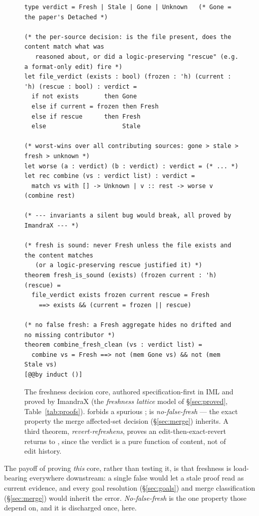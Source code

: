 \begin{figure}[H]
\begin{lstlisting}[language=IML]
type verdict = Fresh | Stale | Gone | Unknown   (* Gone = the paper's Detached *)

(* the per-source decision: is the file present, does the content match what was
   reasoned about, or did a logic-preserving "rescue" (e.g. a format-only edit) fire *)
let file_verdict (exists : bool) (frozen : 'h) (current : 'h) (rescue : bool) : verdict =
  if not exists       then Gone
  else if current = frozen then Fresh
  else if rescue      then Fresh
  else                     Stale

(* worst-wins over all contributing sources: gone > stale > fresh > unknown *)
let worse (a : verdict) (b : verdict) : verdict = (* ... *)
let rec combine (vs : verdict list) : verdict =
  match vs with [] -> Unknown | v :: rest -> worse v (combine rest)

(* --- invariants a silent bug would break, all proved by ImandraX --- *)

(* fresh is sound: never Fresh unless the file exists and the content matches
   (or a logic-preserving rescue justified it) *)
theorem fresh_is_sound (exists) (frozen current : 'h) (rescue) =
  file_verdict exists frozen current rescue = Fresh
    ==> exists && (current = frozen || rescue)

(* no false fresh: a Fresh aggregate hides no drifted and no missing contributor *)
theorem combine_fresh_clean (vs : verdict list) =
  combine vs = Fresh ==> not (mem Gone vs) && not (mem Stale vs)
[@@by induct ()]
\end{lstlisting}
\caption{The freshness decision core, authored specification-first in IML and proved by ImandraX (the
\emph{freshness lattice} model of \S\ref{sec:proved}, Table~\ref{tab:proofs}). 
forbids a spurious ;  is \emph{no-false-fresh} --- the exact
property the merge affected-set decision (\S\ref{sec:merge}) inherits. A third theorem,
\emph{revert-refreshens}, proves an edit-then-exact-revert returns to , since the verdict is
a pure function of content, not of edit history.}
\label{fig:fresh-iml}
\end{figure}

The payoff of proving \emph{this} core, rather than testing it, is that freshness is load-bearing
everywhere downstream: a single false  would let a stale proof read as current evidence, and
every goal resolution (\S\ref{sec:goals}) and merge classification (\S\ref{sec:merge}) would inherit the
error. \emph{No-false-fresh} is the one property those depend on, and it is discharged once, here.
